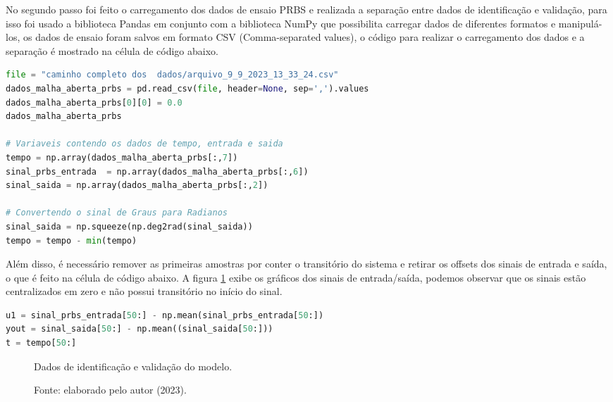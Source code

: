 No segundo passo foi feito o carregamento dos dados de ensaio PRBS e realizada a separação entre dados de identificação e validação, para isso foi usado a biblioteca Pandas em conjunto com a biblioteca NumPy que possibilita carregar dados de diferentes formatos e manipulá-los, os dados de ensaio foram salvos em formato CSV (Comma-separated values), o código para realizar o carregamento dos dados e a separação é mostrado na célula de código abaixo.

\vspace{0.5cm}

\begin{lstlisting}[language=python]
file = "caminho completo dos  dados/arquivo_9_9_2023_13_33_24.csv"
dados_malha_aberta_prbs = pd.read_csv(file, header=None, sep=',').values
dados_malha_aberta_prbs[0][0] = 0.0
dados_malha_aberta_prbs

# Variaveis contendo os dados de tempo, entrada e saida
tempo = np.array(dados_malha_aberta_prbs[:,7])
sinal_prbs_entrada  = np.array(dados_malha_aberta_prbs[:,6])
sinal_saida = np.array(dados_malha_aberta_prbs[:,2])

# Convertendo o sinal de Graus para Radianos
sinal_saida = np.squeeze(np.deg2rad(sinal_saida))
tempo = tempo - min(tempo)
\end{lstlisting}


Além disso, é necessário remover as primeiras amostras por conter o transitório do sistema e retirar os offsets dos sinais de entrada e saída, o que é feito na célula de código abaixo. A figura \ref{fig3:image_20} exibe os gráficos dos sinais de entrada/saída, podemos observar que os sinais estão centralizados em zero e não possui transitório no início do sinal.

\vspace{0.5cm}


\begin{lstlisting}[language=python]
u1 = sinal_prbs_entrada[50:] - np.mean(sinal_prbs_entrada[50:])
yout = sinal_saida[50:] - np.mean((sinal_saida[50:]))
t = tempo[50:]
\end{lstlisting}

\begin{figure}[!h]
	\centering
	\caption{Dados de identificação e validação do modelo.}
	\caption*{Fonte: elaborado pelo autor (2023).}
	\label{fig3:image_20}
\end{figure}


